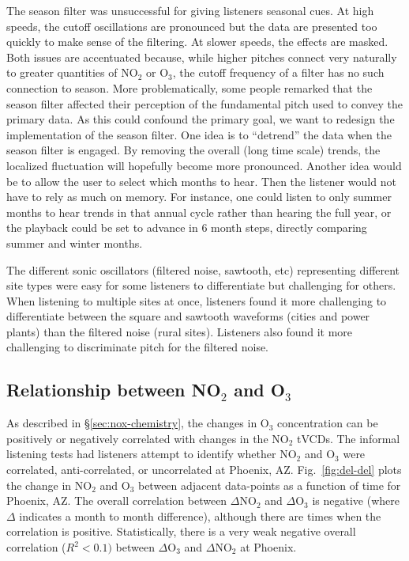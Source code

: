 \documentclass[a4paper,10pt,oneside]{article}
\newcommand{\ce}[1]{$\mathrm{#1}$}
\begin{document}
\begin{sloppy}
The season filter was unsuccessful for giving listeners seasonal cues. At high speeds, the cutoff oscillations are pronounced but the data are presented too quickly to make sense of the filtering. At slower speeds, the effects are masked. Both issues are accentuated because, while higher pitches connect very naturally to greater quantities of \ce{NO_2} or \ce{O_3}, the cutoff frequency of a filter has no such connection to season.  More problematically, some people remarked that the season filter affected their perception of the fundamental pitch used to convey the primary data. As this could confound the primary goal, we want to redesign the implementation of the season filter. One idea is to ``detrend'' the data when the season filter is engaged. By removing the overall (long time scale) trends, the localized fluctuation will hopefully become more pronounced. Another idea would be to allow the user to select which months to hear. Then the listener would not have to rely as much on memory.  For instance, one could listen to only summer months to hear trends in that  annual cycle rather than hearing the full year, or the playback could be set to advance in 6 month steps, directly comparing summer and winter months.   

The different sonic oscillators (filtered noise, sawtooth, etc) representing different site types were easy for some listeners to differentiate but challenging for others.  When listening to multiple sites at once, listeners found it more challenging to differentiate between the square and sawtooth waveforms (cities and power plants) than the filtered noise (rural sites). Listeners also found it more challenging to discriminate pitch for the filtered noise.   

\subsection{Relationship between NO$_2$ and O$_3$}

	As described in \S\ref{sec:nox-chemistry}, the changes in \ce{O_3} concentration can be positively or negatively correlated with changes in the \ce{NO_2} tVCDs. The informal listening tests had listeners attempt to identify whether \ce{NO_2} and \ce{O_3} were correlated, anti-correlated, or uncorrelated at Phoenix, AZ. Fig.~\ref{fig:del-del} plots the change in \ce{NO_2} and \ce{O_3} between adjacent data-points as a function of time for Phoenix, AZ. The overall correlation between $\Delta$\ce{NO_2} and $\Delta$\ce{O_3} is negative (where $\Delta$ indicates a month to month difference), although there are times when the correlation is positive. Statistically, there is a very weak negative overall correlation ($R^2 < 0.1)$ between $\Delta$\ce{O_3} and $\Delta$\ce{NO_2} at Phoenix. 
	

\end{sloppy}
\end{document}

